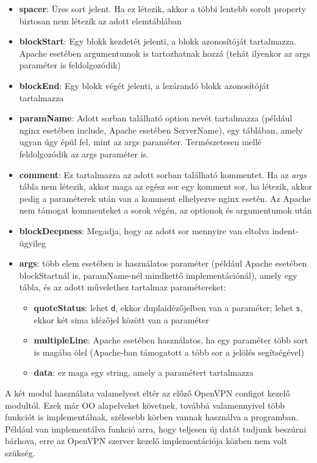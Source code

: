 \begin{itemize}
    \item \textbf{spacer}: Üres sort jelent. Ha ez létezik, akkor a többi lentebb sorolt property biztosan nem létezik az adott elemtáblában
    \item \textbf{blockStart}: Egy blokk kezdetét jelenti, a blokk azonosítóját tartalmazza. Apache esetében argumentumok is tartozhatnak hozzá (tehát ilyenkor az args paraméter is feldolgozódik)
    \item \textbf{blockEnd}: Egy blokk végét jelenti, a lezárandó blokk azonosítóját tartalmazza
    \item \textbf{paramName}: Adott sorban található option nevét tartalmazza (például nginx esetében include, Apache esetében ServerName), egy táblában, amely ugyan úgy épül fel, mint az args paraméter. Természetesen mellé feldolgozódik az args paraméter is.
    \item \textbf{comment}: Ez tartalmazza az adott sorban található kommentet. Ha az \textit{args} tábla nem létezik, akkor maga az egész sor egy komment sor, ha létezik, akkor pedig a paraméterek után van a komment elhelyezve nginx esetén. Az Apache nem támogat kommenteket a sorok végén, az optionok és argumentumok után
    \item \textbf{blockDeepness}: Megadja, hogy az adott sor mennyire van eltolva indent-ügyileg
    \item \textbf{args}: több elem esetében is használatos paraméter (például Apache esetében blockStartnál is, paramName-nél mindkettő implementációnál), amely egy tábla, és az adott művelethez tartalmaz paramétereket:
        \begin{itemize}
            \item \textbf{quoteStatus}: lehet \texttt{d}, ekkor duplaidézőjelben van a paraméter; lehet \texttt{s}, ekkor két sima idézőjel között van a paraméter
            \item \textbf{multipleLine}: Apache esetében használatos, ha egy paraméter több sort is magába ölel (Apache-ban támogatott a több sor a \texttt{\detokenize{\\}} jelölés segítségével)
            \item \textbf{data}: ez maga egy string, amely a paramétert tartalmazza
        \end{itemize}
\end{itemize}

A két modul használata valamelyest eltér az előző OpenVPN configot kezelő modultól. Ezek már OO alapelveket követnek, továbbá valamennyivel több funkciót is implementálnak, szélesebb körben vannak használva a programban. Például van implementálva funkció arra, hogy teljesen új datát tudjunk beszúrni bárhova, erre az OpenVPN szerver kezelő implementációja közben nem volt szükség.

